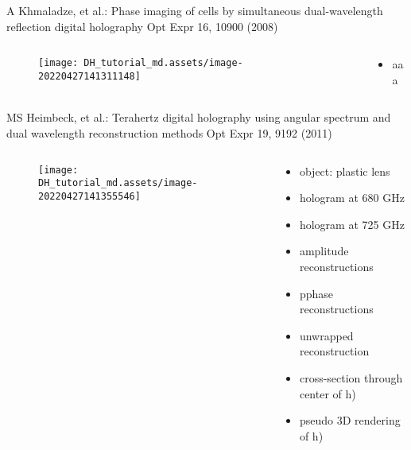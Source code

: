 \documentclass[t, aspectratio=169]{beamer}
\begin{document}
\begin{frame}{A Khmaladze, et al.: Phase imaging of cells by simultaneous dual-wavelength reflection digital holography}
	\vspace{-3 mm}
	\small Opt Expr 16, 10900 (2008)
	\begin{columns}
		\begin{column}{.6\textwidth}
			\begin{figure}
				\texttt{[image: DH\_tutorial\_md.assets/image-20220427141311148]}
			\end{figure}
		\end{column}
		\begin{column}{.4\textwidth}
			\begin{itemize}
				\item aaa
			\end{itemize}
		\end{column}
	\end{columns}
\end{frame}


\begin{frame}{MS Heimbeck, et al.: Terahertz digital holography using angular spectrum and dual wavelength reconstruction methods}
	\vspace{-3 mm}
	\small Opt Expr 19, 9192 (2011)
	\begin{columns}
		\begin{column}{.6\textwidth}
			\vspace{-5 mm}
			\begin{figure}
				\texttt{[image: DH\_tutorial\_md.assets/image-20220427141355546]}
			\end{figure}
		\end{column}
		\begin{column}{.4\textwidth}
			\begin{itemize}
				\item[a) ] object: plastic lens
				\item[b) ] hologram at 680 GHz
				\item[c) ] hologram at 725 GHz
				\item[d) \& e) ] amplitude reconstructions
				\item[f) \& g) ] pphase reconstructions
				\item[h) ] unwrapped reconstruction
				\item[i) ] cross-section through center of h) 
				\item[j) ] pseudo 3D rendering of h)
			\end{itemize}
		\end{column}
	\end{columns}
\end{frame}
\end{document}
